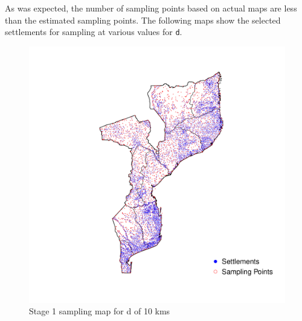 \documentclass[
  12pt,
  a4paper]{article}
\begin{document}
As was expected, the number of sampling points based on actual maps are less than the estimated sampling points. The following maps show the selected settlements for sampling at various values for \texttt{d}.

\begin{figure}[H]

{\centering \includegraphics{mozambiqueNotes_files/figure-latex/stage1plot10-1} 

}

\caption{Stage 1 sampling map for d of 10 kms}\label{fig:stage1plot10}
\end{figure}
\end{document}
